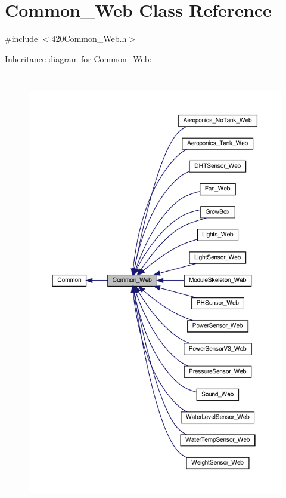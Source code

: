 \hypertarget{class_common___web}{}\section{Common\+\_\+\+Web Class Reference}
\label{class_common___web}


{\ttfamily \#include $<$420\+Common\+\_\+\+Web.\+h$>$}



Inheritance diagram for Common\+\_\+\+Web\+:
\nopagebreak
\begin{figure}[H]
\begin{center}
\leavevmode
\includegraphics[height=550pt]{class_common___web__inherit__graph}
\end{center}
\end{figure}



